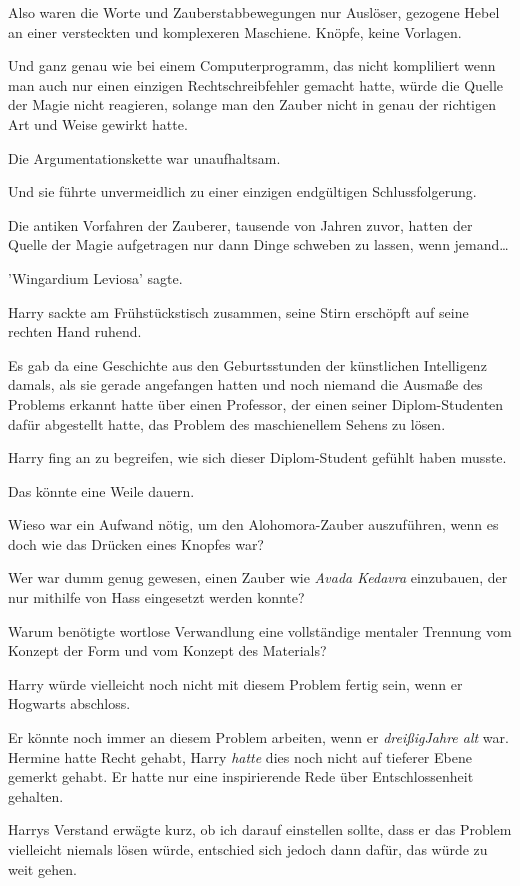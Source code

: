 {Also waren die Worte und Zauberstabbewegungen nur Auslöser, gezogene Hebel an einer versteckten und komplexeren Maschiene. Knöpfe, keine Vorlagen.

Und ganz genau wie bei einem Computerprogramm, das nicht kompliliert wenn man auch nur einen einzigen Rechtschreibfehler gemacht hatte, würde die Quelle der Magie nicht reagieren, solange man den Zauber nicht in genau der richtigen Art und Weise gewirkt hatte.

Die Argumentationskette war unaufhaltsam.

Und sie führte unvermeidlich zu einer einzigen endgültigen Schlussfolgerung.

Die antiken Vorfahren der Zauberer, tausende von Jahren zuvor, hatten der Quelle der Magie aufgetragen nur dann Dinge schweben zu lassen, wenn jemand…

'Wingardium Leviosa' sagte.

Harry sackte am Frühstückstisch zusammen, seine Stirn erschöpft auf seine rechten Hand ruhend.

Es gab da eine Geschichte aus den Geburtsstunden der künstlichen Intelligenz \later damals, als sie gerade angefangen hatten und noch niemand die Ausmaße des Problems erkannt hatte \later über einen Professor, der einen seiner Diplom-Studenten dafür abgestellt hatte, das Problem des maschienellem Sehens zu lösen.

Harry fing an zu begreifen, wie sich dieser Diplom-Student gefühlt haben musste.

Das könnte eine Weile dauern.

Wieso war ein Aufwand nötig, um den Alohomora-Zauber auszuführen, wenn es doch wie das Drücken eines Knopfes war?

Wer war dumm genug gewesen, einen Zauber wie \emph{Avada Kedavra} einzubauen, der nur mithilfe von Hass eingesetzt werden konnte?

Warum benötigte wortlose Verwandlung eine vollständige mentaler Trennung vom Konzept der Form und vom Konzept des Materials?

Harry würde vielleicht noch nicht mit diesem Problem fertig sein, wenn er Hogwarts abschloss.

Er könnte noch immer an diesem Problem arbeiten, wenn er \emph{dreißigJahre alt} war. Hermine hatte Recht gehabt, Harry \emph{hatte} dies noch nicht auf tieferer Ebene gemerkt gehabt. Er hatte nur eine inspirierende Rede über Entschlossenheit gehalten.

Harrys Verstand erwägte kurz, ob ich darauf einstellen sollte, dass er das Problem vielleicht niemals lösen würde, entschied sich jedoch dann dafür, das würde zu weit gehen.

}

